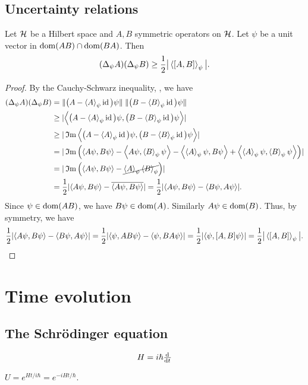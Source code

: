\subsection{Uncertainty relations}
\begin{theorem}
Let $\mathcal{H}$ be a Hilbert space and $A,B$ symmetric operators on $\mathcal{H}$. Let $\psi$ be a unit vector in $\operatorname{dom}(AB)\cap \operatorname{dom}(BA)$. Then
\[ (\var_\psi A)(\var_\psi B) \geq \frac{1}{2}\big|\expval{\commutator{A,B}}_\psi\big|. \]
\end{theorem}
\begin{proof}
By the Cauchy-Schwarz inequality, , we have
\begin{align*}
(\var_\psi A)(\var_\psi B) &= \norm{\big(A - \expval{A}_\psi\id\big)\psi}\;\norm{\big(B - \expval{B}_\psi\id\big)\psi} \\
&\geq |\inner{\big(A - \expval{A}_\psi\id\big)\psi, \big(B - \expval{B}_\psi\id\big)\psi}| \\
&\geq |\Im\inner{\big(A - \expval{A}_\psi\id\big)\psi, \big(B - \expval{B}_\psi\id\big)\psi}| \\
&= |\Im\Big(\inner{A\psi, B\psi} - \inner{A\psi, \expval{B}_\psi\psi} - \inner{\expval{A}_\psi\psi, B\psi} + \inner{\expval{A}_\psi\psi, \expval{B}_\psi\psi}\Big)| \\
&= |\Im\Big(\inner{A\psi, B\psi} - \cancel{\expval{A}_\psi\expval{B}_\psi}\Big)| \\
&= \frac{1}{2}|\inner{A\psi, B\psi} - \overline{\inner{A\psi, B\psi}}| = \frac{1}{2}|\inner{A\psi, B\psi} - \inner{B\psi, A\psi}|.
\end{align*}
Since $\psi \in \operatorname{dom}(AB)$, we have $B\psi\in \operatorname{dom}(A)$. Similarly $A\psi\in \operatorname{dom}(B)$. Thus, by symmetry, we have 
\[ \frac{1}{2}|\inner{A\psi, B\psi} - \inner{B\psi, A\psi}| = \frac{1}{2}|\inner{\psi, AB\psi} - \inner{\psi, BA\psi}| = \frac{1}{2}|\inner{\psi, \commutator{A,B}\psi}| = \frac{1}{2}\big|\expval{\commutator{A,B}}_\psi\big|. \]
\end{proof}

\section{Time evolution}
\subsection{The Schrödinger equation}
\[ H = i\hbar\od{}{t} \]

\begin{lemma}
$U = e^{Ht / i\hbar} = e^{-iHt/\hbar}$.
\end{lemma}


